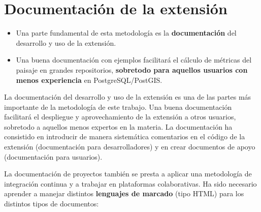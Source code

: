 \section{Documentación de la extensión}

\begin{graybox}
\begin{itemize}
\item Una parte fundamental de esta metodología es la \textbf{documentación} del desarrollo y uso de la extensión. 
\item Una buena documentación con ejemplos facilitará el cálculo de métricas del paisaje en grandes repositorios, \textbf{sobretodo para aquellos usuarios con menos experiencia} en PostgreSQL/PostGIS.
\end{itemize}
\end{graybox}

La documentación del desarrollo y uso de la extensión es una de las partes más importante de la metodología de este trabajo. Una buena documentación facilitará el despliegue y aprovechamiento de la extensión a otros usuarios, sobretodo a aquellos menos expertos en la materia. La documentación ha consistido en introducir de manera sistemática comentarios en el código de la extensión (documentación para desarrolladores) y en crear documentos de apoyo (documentación para usuarios).

La documentación de proyectos también se presta a aplicar una metodología de integración continua y a trabajar en plataformas colaborativas. Ha sido necesario aprender a manejar distintos \textbf{lenguajes de marcado} (tipo HTML) para los distintos tipos de documentos:

